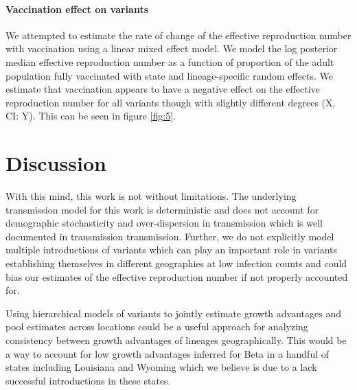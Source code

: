 \documentclass[11pt,oneside,letterpaper]{article}
\begin{document}
\paragraph{Vaccination effect on variants}

We attempted to estimate the rate of change of the effective reproduction number with vaccination using a linear mixed effect model. We model the log posterior median effective reproduction number as a function of proportion of the adult population fully vaccinated with state and lineage-specific random effects. We estimate that vaccination appears to have a negative effect on the effective reproduction number for all variants though with slightly different degrees (X, CI: Y). This can be seen in figure \ref{fig:5}.


\section*{Discussion}


With this mind, this work is not without limitations.
The underlying transmission model for this work is deterministic and does not account for demographic stochasticity and over-dispersion in transmission which is well documented in transmission transmission.
Further, we do not explicitly model multiple introductions of variants which can play an important role in variants establishing themselves in different geographies at low infection counts and could bias our estimates of the effective reproduction number if not properly accounted for.

Using hierarchical models of variants to jointly estimate growth advantages and pool estimates across locations could be a useful approach for analyzing consistency between growth advantages of lineages geographically.
This would be a way to account for low growth advantages inferred for Beta in a handful of states including Louisiana and Wyoming which we believe is due to a lack successful introductions in these states.
\end{document}
